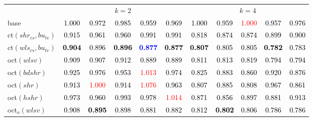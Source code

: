 \begin{tabular}[t]{l|>{}cccc>{}c|ccccc}
\multicolumn{1}{c}{} & \multicolumn{5}{c}{\textbf{$k = 2$}} & \multicolumn{5}{c}{\textbf{$k = 4$}}\\
base & \textcolor{black}{1.000} & \textcolor{black}{0.972} & \textcolor{black}{0.985} & \textcolor{black}{0.959} & \textcolor{black}{0.969} & \textcolor{black}{1.000} & \textcolor{black}{0.959} & \textcolor{red}{1.000} & \textcolor{black}{0.957} & \textcolor{black}{0.976}\\
ct$(shr_{cs}, bu_{te})$ & \textcolor{black}{0.915} & \textcolor{black}{0.961} & \textcolor{black}{0.960} & \textcolor{black}{0.991} & \textcolor{black}{0.991} & \textcolor{black}{0.818} & \textcolor{black}{0.874} & \textcolor{black}{0.874} & \textcolor{black}{0.899} & \textcolor{black}{0.900}\\
ct$(wls_{cs}, bu_{te})$ & \textcolor{black}{\textbf{0.904}} & \textcolor{black}{0.896} & \textcolor{black}{\textbf{0.896}} & \textcolor{blue}{\textbf{0.877}} & \textcolor{black}{\textbf{0.877}} & \textcolor{black}{\textbf{0.807}} & \textcolor{black}{0.805} & \textcolor{black}{0.805} & \textcolor{black}{\textbf{0.782}} & \textcolor{black}{0.783}\\
oct$(wlsv)$ & \textcolor{black}{0.909} & \textcolor{black}{0.907} & \textcolor{black}{0.912} & \textcolor{black}{0.889} & \textcolor{black}{0.889} & \textcolor{black}{0.811} & \textcolor{black}{0.813} & \textcolor{black}{0.819} & \textcolor{black}{0.794} & \textcolor{black}{0.794}\\
oct$(bdshr)$ & \textcolor{black}{0.925} & \textcolor{black}{0.976} & \textcolor{black}{0.953} & \textcolor{red}{1.013} & \textcolor{black}{0.974} & \textcolor{black}{0.825} & \textcolor{black}{0.883} & \textcolor{black}{0.860} & \textcolor{black}{0.920} & \textcolor{black}{0.876}\\
oct$(shr)$ & \textcolor{black}{0.913} & \textcolor{red}{1.000} & \textcolor{black}{0.914} & \textcolor{red}{1.076} & \textcolor{black}{0.963} & \textcolor{black}{0.807} & \textcolor{black}{0.885} & \textcolor{black}{0.808} & \textcolor{black}{0.967} & \textcolor{black}{0.861}\\
oct$(hshr)$ & \textcolor{black}{0.973} & \textcolor{black}{0.960} & \textcolor{black}{0.993} & \textcolor{black}{0.978} & \textcolor{red}{1.014} & \textcolor{black}{0.871} & \textcolor{black}{0.856} & \textcolor{black}{0.897} & \textcolor{black}{0.881} & \textcolor{black}{0.913}\\
oct$_o(wlsv)$ & \textcolor{black}{0.908} & \textcolor{black}{\textbf{0.895}} & \textcolor{black}{0.898} & \textcolor{black}{0.881} & \textcolor{black}{0.882} & \textcolor{black}{0.812} & \textcolor{black}{\textbf{0.802}} & \textcolor{black}{0.806} & \textcolor{black}{0.786} & \textcolor{black}{0.786}\\

\end{tabular}
